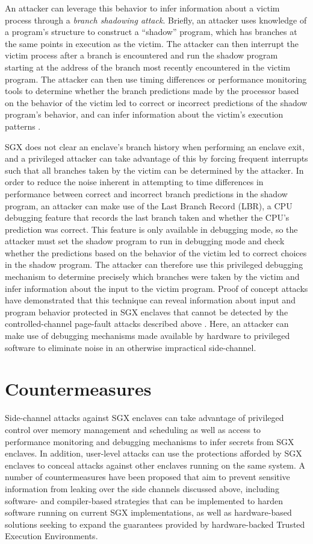 An attacker can leverage this behavior to infer information about a victim process through a \emph{branch shadowing attack}. Briefly, an attacker uses knowledge of a program's structure to construct a ``shadow'' program, which has branches at the same points in execution as the victim. The attacker can then interrupt the victim process after a branch is encountered and run the shadow program starting at the address of the branch most recently encountered in the victim program. The attacker can then use timing differences or performance monitoring tools to determine whether the branch predictions made by the processor based on the behavior of the victim led to correct or incorrect predictions of the shadow program's behavior, and can infer information about the victim's execution patterns \cite{lee_inferring_2017}.

SGX does not clear an enclave's branch history when performing an enclave exit, and a privileged attacker can take advantage of this by forcing frequent interrupts such that all branches taken by the victim can be determined by the attacker. In order to reduce the noise inherent in attempting to time differences in performance between correct and incorrect branch predictions in the shadow program, an attacker can make use of the Last Branch Record (LBR), a CPU debugging feature that records the last branch taken and whether the CPU's prediction was correct. This feature is only available in debugging mode, so the attacker must set the shadow program to run in debugging mode and check whether the predictions based on the behavior of the victim led to correct choices in the shadow program. The attacker can therefore use this privileged debugging mechanism to determine precisely which branches were taken by the victim and infer information about the input to the victim program. Proof of concept attacks have demonstrated that this technique can reveal information about input and program behavior protected in SGX enclaves that cannot be detected by the controlled-channel page-fault attacks described above \cite{lee_inferring_2017, shinde_preventing_2015}. Here, an attacker can make use of debugging mechanisms made available by hardware to privileged software to eliminate noise in an otherwise impractical side-channel.

\section{Countermeasures}

Side-channel attacks against SGX enclaves can take advantage of privileged control over memory management and scheduling as well as access to performance monitoring and debugging mechanisms to infer secrets from SGX enclaves. In addition, user-level attacks can use the protections afforded by SGX enclaves to conceal attacks against other enclaves running on the same system. A number of countermeasures have been proposed that aim to prevent sensitive information from leaking over the side channels discussed above, including software- and compiler-based strategies that can be implemented to harden software running on current SGX implementations, as well as hardware-based solutions seeking to expand the guarantees provided by hardware-backed Trusted Execution Environments.


